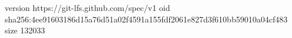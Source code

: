 version https://git-lfs.github.com/spec/v1
oid sha256:4ee91603186d15a76d51a02f4591a155fdf2061e827d3f610bb59010a04cf483
size 132033
